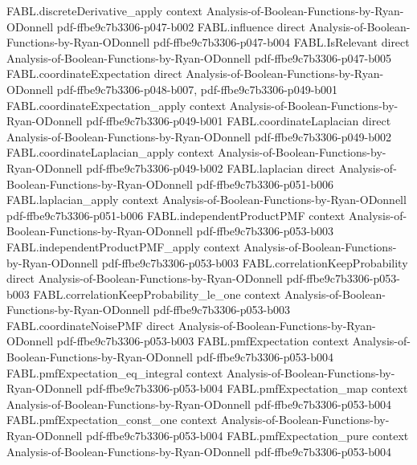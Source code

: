 \begin{theorem}
\proofstep
  {FABL.discreteDerivative_apply}
  {context}
  {Analysis-of-Boolean-Functions-by-Ryan-ODonnell}
  {pdf-ffbe9c7b3306-p047-b002}
\proofstep
  {FABL.influence}
  {direct}
  {Analysis-of-Boolean-Functions-by-Ryan-ODonnell}
  {pdf-ffbe9c7b3306-p047-b004}
\proofstep
  {FABL.IsRelevant}
  {direct}
  {Analysis-of-Boolean-Functions-by-Ryan-ODonnell}
  {pdf-ffbe9c7b3306-p047-b005}
\proofstep
  {FABL.coordinateExpectation}
  {direct}
  {Analysis-of-Boolean-Functions-by-Ryan-ODonnell}
  {pdf-ffbe9c7b3306-p048-b007,
    pdf-ffbe9c7b3306-p049-b001}
\proofstep
  {FABL.coordinateExpectation_apply}
  {context}
  {Analysis-of-Boolean-Functions-by-Ryan-ODonnell}
  {pdf-ffbe9c7b3306-p049-b001}
\proofstep
  {FABL.coordinateLaplacian}
  {direct}
  {Analysis-of-Boolean-Functions-by-Ryan-ODonnell}
  {pdf-ffbe9c7b3306-p049-b002}
\proofstep
  {FABL.coordinateLaplacian_apply}
  {context}
  {Analysis-of-Boolean-Functions-by-Ryan-ODonnell}
  {pdf-ffbe9c7b3306-p049-b002}
\proofstep
  {FABL.laplacian}
  {direct}
  {Analysis-of-Boolean-Functions-by-Ryan-ODonnell}
  {pdf-ffbe9c7b3306-p051-b006}
\proofstep
  {FABL.laplacian_apply}
  {context}
  {Analysis-of-Boolean-Functions-by-Ryan-ODonnell}
  {pdf-ffbe9c7b3306-p051-b006}
\proofstep
  {FABL.independentProductPMF}
  {context}
  {Analysis-of-Boolean-Functions-by-Ryan-ODonnell}
  {pdf-ffbe9c7b3306-p053-b003}
\proofstep
  {FABL.independentProductPMF_apply}
  {context}
  {Analysis-of-Boolean-Functions-by-Ryan-ODonnell}
  {pdf-ffbe9c7b3306-p053-b003}
\proofstep
  {FABL.correlationKeepProbability}
  {direct}
  {Analysis-of-Boolean-Functions-by-Ryan-ODonnell}
  {pdf-ffbe9c7b3306-p053-b003}
\proofstep
  {FABL.correlationKeepProbability_le_one}
  {context}
  {Analysis-of-Boolean-Functions-by-Ryan-ODonnell}
  {pdf-ffbe9c7b3306-p053-b003}
\proofstep
  {FABL.coordinateNoisePMF}
  {direct}
  {Analysis-of-Boolean-Functions-by-Ryan-ODonnell}
  {pdf-ffbe9c7b3306-p053-b003}
\proofstep
  {FABL.pmfExpectation}
  {context}
  {Analysis-of-Boolean-Functions-by-Ryan-ODonnell}
  {pdf-ffbe9c7b3306-p053-b004}
\proofstep
  {FABL.pmfExpectation_eq_integral}
  {context}
  {Analysis-of-Boolean-Functions-by-Ryan-ODonnell}
  {pdf-ffbe9c7b3306-p053-b004}
\proofstep
  {FABL.pmfExpectation_map}
  {context}
  {Analysis-of-Boolean-Functions-by-Ryan-ODonnell}
  {pdf-ffbe9c7b3306-p053-b004}
\proofstep
  {FABL.pmfExpectation_const_one}
  {context}
  {Analysis-of-Boolean-Functions-by-Ryan-ODonnell}
  {pdf-ffbe9c7b3306-p053-b004}
\proofstep
  {FABL.pmfExpectation_pure}
  {context}
  {Analysis-of-Boolean-Functions-by-Ryan-ODonnell}
  {pdf-ffbe9c7b3306-p053-b004}
\proofstep

\end{theorem}

